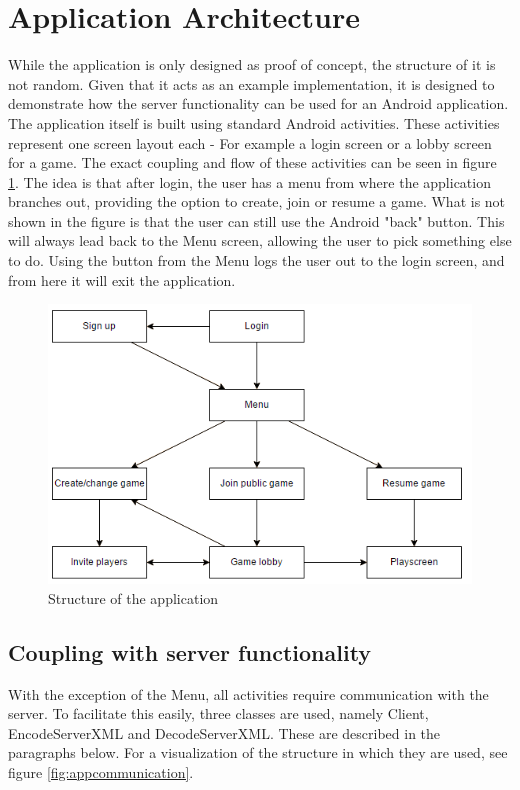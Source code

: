 \section{Application Architecture}
\label{sec:application_architecture}
While the application is only designed as proof of concept, the structure of it is not random. Given that it acts as an example implementation, it is designed to demonstrate how the server functionality can be used for an Android application. The application itself is built using standard Android activities. These activities represent one screen layout each - For example a login screen or a lobby screen for a game. The exact coupling and flow of these activities can be seen in figure \ref{fig:appstructure}. The idea is that after login, the user has a menu from where the application branches out, providing the option to create, join or resume a game. What is not shown in the figure is that the user can still use the Android "back" button. This will always lead back to the Menu screen, allowing the user to pick something else to do. Using the button from the Menu logs the user out to the login screen, and from here it will exit the application.

\begin{figure}[H]
\centering
\includegraphics[width=\textwidth]{billeder/appstructure.png}
\caption{Structure of the application}
\label{fig:appstructure}
\end{figure}


\subsection{Coupling with server functionality}
With the exception of the Menu, all activities require communication with the server. To facilitate this easily, three classes are used, namely Client, EncodeServerXML and DecodeServerXML. These are described in the paragraphs below. For a visualization of the structure in which they are used, see figure \ref{fig:appcommunication}.


